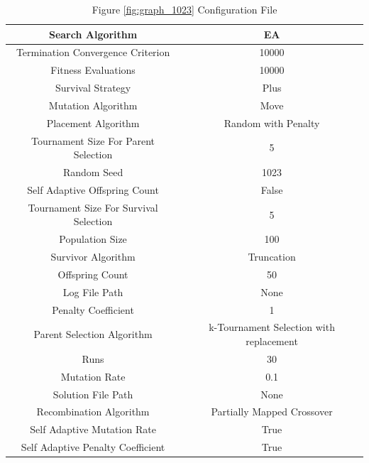 \documentclass{standalone}
\begin{document}
\begin{table}[!htb]
	\centering
	\caption{Figure \ref{fig:graph_1023} Configuration File}
	\label{tab:graph_1023}
	\begin{tabular}{| c | c |}
		\hline
		Search Algorithm		& EA		 \\
		\hline
		Termination Convergence Criterion		& 10000		 \\
		\hline
		Fitness Evaluations		& 10000		 \\
		\hline
		Survival Strategy		& Plus		 \\
		\hline
		Mutation Algorithm		& Move		 \\
		\hline
		Placement Algorithm		& Random with Penalty		 \\
		\hline
		Tournament Size For Parent Selection		& 5		 \\
		\hline
		Random Seed		& 1023		 \\
		\hline
		Self Adaptive Offspring Count		& False		 \\
		\hline
		Tournament Size For Survival Selection		& 5		 \\
		\hline
		Population Size		& 100		 \\
		\hline
		Survivor Algorithm		& Truncation		 \\
		\hline
		Offspring Count		& 50		 \\
		\hline
		Log File Path		& None		 \\
		\hline
		Penalty Coefficient		& 1		 \\
		\hline
		Parent Selection Algorithm		& k-Tournament Selection with replacement		 \\
		\hline
		Runs		& 30		 \\
		\hline
		Mutation Rate		& 0.1		 \\
		\hline
		Solution File Path		& None		 \\
		\hline
		Recombination Algorithm		& Partially Mapped Crossover		 \\
		\hline
		Self Adaptive Mutation Rate		& True		 \\
		\hline
		Self Adaptive Penalty Coefficient		& True		 \\
		\hline
	\end{tabular}
\end{table}
\end{document}
